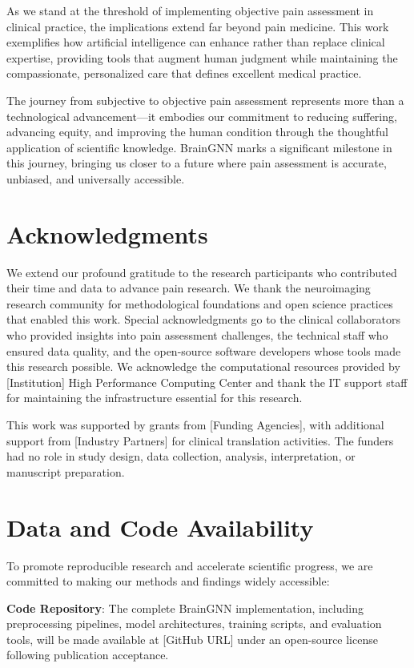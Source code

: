 \documentclass[10pt,journal,compsoc]{IEEEtran}
\begin{document}
As we stand at the threshold of implementing objective pain assessment in clinical practice, the implications extend far beyond pain medicine. This work exemplifies how artificial intelligence can enhance rather than replace clinical expertise, providing tools that augment human judgment while maintaining the compassionate, personalized care that defines excellent medical practice.

The journey from subjective to objective pain assessment represents more than a technological advancement---it embodies our commitment to reducing suffering, advancing equity, and improving the human condition through the thoughtful application of scientific knowledge. BrainGNN marks a significant milestone in this journey, bringing us closer to a future where pain assessment is accurate, unbiased, and universally accessible.

\section*{Acknowledgments}

We extend our profound gratitude to the research participants who contributed their time and data to advance pain research. We thank the neuroimaging research community for methodological foundations and open science practices that enabled this work. Special acknowledgments go to the clinical collaborators who provided insights into pain assessment challenges, the technical staff who ensured data quality, and the open-source software developers whose tools made this research possible. We acknowledge the computational resources provided by [Institution] High Performance Computing Center and thank the IT support staff for maintaining the infrastructure essential for this research.

This work was supported by grants from [Funding Agencies], with additional support from [Industry Partners] for clinical translation activities. The funders had no role in study design, data collection, analysis, interpretation, or manuscript preparation.

\section*{Data and Code Availability}

To promote reproducible research and accelerate scientific progress, we are committed to making our methods and findings widely accessible:

\textbf{Code Repository}: The complete BrainGNN implementation, including preprocessing pipelines, model architectures, training scripts, and evaluation tools, will be made available at [GitHub URL] under an open-source license following publication acceptance.
\end{document}
